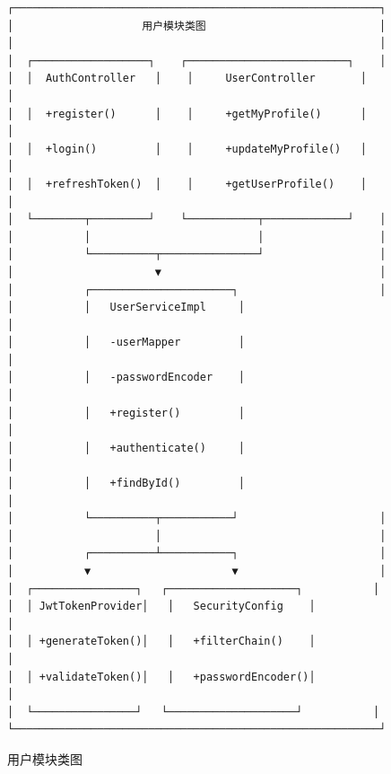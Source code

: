 \documentclass[12pt,a4paper]{ctexart}
\numberwithin{figure}{section}
\numberwithin{table}{section}
\begin{document}
\begin{figure}[H]
\centering
{\small
\begin{verbatim}
┌─────────────────────────────────────────────────────────┐
│                    用户模块类图                           │
│                                                         │
│  ┌──────────────────┐    ┌─────────────────────────┐    │
│  │  AuthController   │    │     UserController       │    │
│  │  +register()      │    │     +getMyProfile()      │    │
│  │  +login()         │    │     +updateMyProfile()   │    │
│  │  +refreshToken()  │    │     +getUserProfile()    │    │
│  └────────┬─────────┘    └───────────┬─────────────┘    │
│           │                          │                  │
│           └──────────┬───────────────┘                  │
│                      ▼                                  │
│           ┌──────────────────────┐                      │
│           │   UserServiceImpl     │                      │
│           │   -userMapper         │                      │
│           │   -passwordEncoder    │                      │
│           │   +register()         │                      │
│           │   +authenticate()     │                      │
│           │   +findById()         │                      │
│           └──────────┬───────────┘                      │
│                      │                                  │
│           ┌──────────┴───────────┐                      │
│           ▼                      ▼                      │
│  ┌────────────────┐   ┌────────────────────┐           │
│  │ JwtTokenProvider│   │   SecurityConfig    │           │
│  │ +generateToken()│   │   +filterChain()    │           │
│  │ +validateToken()│   │   +passwordEncoder()│           │
│  └────────────────┘   └────────────────────┘           │
└─────────────────────────────────────────────────────────┘
\end{verbatim}
}
\caption{用户模块类图}
\label{fig:m1-class}
\end{figure}
\end{document}
